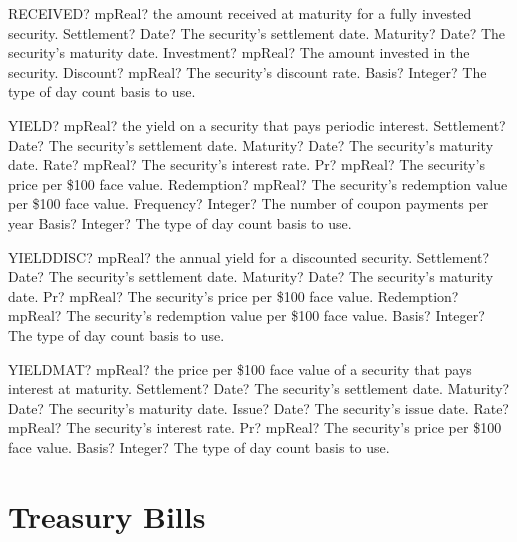 \documentclass[12pt,a4paper,openany]{book}
\begin{document}
\begin{mpFunctionsExtract}
\mpWorksheetFunctionFiveNotImplemented
{RECEIVED? mpReal? the amount received at maturity for a fully invested security.}
{Settlement? Date?  The security's settlement date.}
{Maturity? Date? The security's maturity date.}
{Investment? mpReal? The amount invested in the security.}
{Discount? mpReal? The security's discount rate.}
{Basis? Integer? The type of day count basis to use.}
\end{mpFunctionsExtract}

\begin{mpFunctionsExtract}
\mpWorksheetFunctionSevenNotImplemented
{YIELD? mpReal? the yield on a security that pays periodic interest.}
{Settlement? Date?  The security's settlement date.}
{Maturity? Date? The security's maturity date.}
{Rate? mpReal? The security's interest rate.}
{Pr? mpReal? The security's price per \$100 face value.}
{Redemption? mpReal? The security's redemption value per \$100 face value.}
{Frequency? Integer? The number of coupon payments per year}
{Basis? Integer? The type of day count basis to use.}
\end{mpFunctionsExtract}

\begin{mpFunctionsExtract}
\mpWorksheetFunctionFiveNotImplemented
{YIELDDISC? mpReal? the annual yield for a discounted security.}
{Settlement? Date?  The security's settlement date.}
{Maturity? Date? The security's maturity date.}
{Pr? mpReal? The security's price per \$100 face value.}
{Redemption? mpReal? The security's redemption value per \$100 face value.}
{Basis? Integer? The type of day count basis to use.}
\end{mpFunctionsExtract}

\begin{mpFunctionsExtract}
\mpWorksheetFunctionSixNotImplemented
{YIELDMAT? mpReal? the price per \$100 face value  of a security that pays interest at maturity.}
{Settlement? Date?  The security's settlement date.}
{Maturity? Date? The security's maturity date.}
{Issue? Date? The security's issue date.}
{Rate? mpReal? The security's interest rate.}
{Pr? mpReal? The security's price per \$100 face value.}
{Basis? Integer? The type of day count basis to use.}
\end{mpFunctionsExtract}

\section{Treasury Bills}
\end{document}
